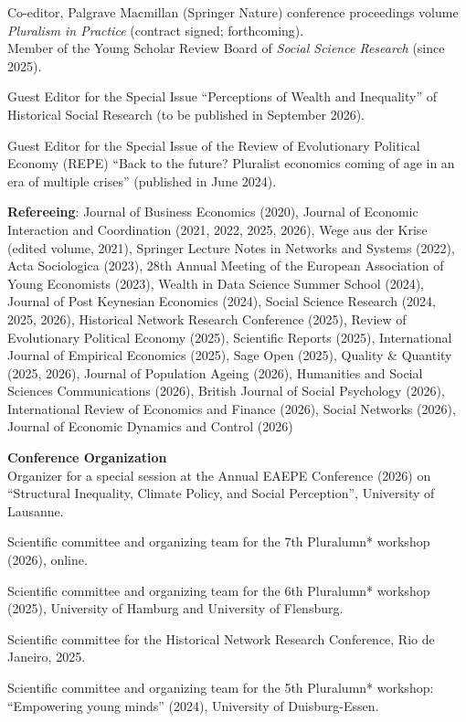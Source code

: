 \documentclass[margin]{res}
\begin{document}
\begin{resume}
	Co-editor, Palgrave Macmillan (Springer Nature) conference proceedings volume \textit{Pluralism in Practice} (contract signed; forthcoming).\\
	
	Member of the Young Scholar Review Board of \textit{Social Science Research} (since 2025).
	
	Guest Editor for the Special Issue ``Perceptions of Wealth and Inequality'' of Historical Social Research (to be published in September 2026).
	
	Guest Editor for the Special Issue of the Review of Evolutionary Political Economy (REPE) ``Back to the future? Pluralist economics coming of age in an era of multiple crises'' (published in June 2024).
	
	\textbf{Refereeing}:	Journal of Business Economics (2020), Journal of Economic Interaction and Coordination (2021, 2022, 2025, 2026), Wege aus der Krise (edited volume, 2021), Springer Lecture Notes in Networks and Systems (2022), Acta Sociologica (2023), 28th Annual Meeting of the European Association of Young Economists (2023), Wealth in Data Science Summer School (2024), Journal of Post Keynesian Economics (2024), Social Science Research (2024, 2025, 2026), Historical Network Research Conference (2025), Review of Evolutionary Political Economy (2025), Scientific Reports (2025), International Journal of Empirical Economics (2025), Sage Open (2025), Quality \& Quantity (2025, 2026), Journal of Population Ageing (2026), Humanities and Social Sciences Communications (2026), British Journal of Social Psychology (2026), International Review of Economics and Finance (2026), Social Networks (2026), Journal of Economic Dynamics and Control (2026)
	
	
	\textbf{Conference Organization}\\
	Organizer for a special session at the Annual EAEPE Conference (2026) on ``Structural Inequality, Climate Policy, and Social Perception'', University of Lausanne.
	
	Scientific committee and organizing team for the 7th Pluralumn* workshop (2026), online.
	
	Scientific committee and organizing team for the 6th Pluralumn* workshop (2025), University of Hamburg and University of Flensburg.
	
	Scientific committee for the Historical Network Research Conference, Rio de Janeiro, 2025.
	
	Scientific committee and organizing team for the 5th Pluralumn* workshop: ``Empowering young minds'' (2024), University of Duisburg-Essen.
	

\end{resume}
\end{document}
